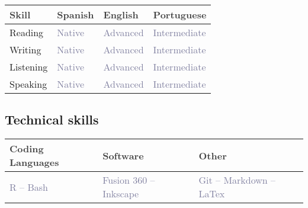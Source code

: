 \documentclass[11pt,a4paper,]{awesome-cv}
\begin{document}
\begin{table}[H]
\centering\begingroup\fontsize{10}{12}\selectfont

\begin{tabular}{>{\centering\arraybackslash}p{4.5cm}>{\centering\arraybackslash}p{4.5cm}>{\centering\arraybackslash}p{4.5cm}>{\centering\arraybackslash}p{4.5cm}}
\toprule
\textcolor[HTML]{414141}{\textbf{Skill}} & \textcolor[HTML]{414141}{\textbf{Spanish}} & \textcolor[HTML]{414141}{\textbf{English}} & \textcolor[HTML]{414141}{\textbf{Portuguese}}\\
\midrule
Reading & \textcolor[HTML]{7f7f9f}{Native} & \textcolor[HTML]{7f7f9f}{Advanced} & \textcolor[HTML]{7f7f9f}{Intermediate}\\
Writing & \textcolor[HTML]{7f7f9f}{Native} & \textcolor[HTML]{7f7f9f}{Advanced} & \textcolor[HTML]{7f7f9f}{Intermediate}\\
Listening & \textcolor[HTML]{7f7f9f}{Native} & \textcolor[HTML]{7f7f9f}{Advanced} & \textcolor[HTML]{7f7f9f}{Intermediate}\\
Speaking & \textcolor[HTML]{7f7f9f}{Native} & \textcolor[HTML]{7f7f9f}{Advanced} & \textcolor[HTML]{7f7f9f}{Intermediate}\\
\bottomrule
\end{tabular}
\endgroup{}
\end{table}

\hypertarget{technical-skills}{%
\subsection{\texorpdfstring{ Technical
skills}{ Technical skills}}\label{technical-skills}}

\begin{table}[H]
\centering\begingroup\fontsize{10}{12}\selectfont

\begin{tabular}{>{\centering\arraybackslash}p{4.75cm}>{\centering\arraybackslash}p{4.75cm}>{\centering\arraybackslash}p{4.75cm}}
\toprule
\textcolor[HTML]{414141}{\textbf{Coding Languages}} & \textcolor[HTML]{414141}{\textbf{Software}} & \textcolor[HTML]{414141}{\textbf{Other}}\\
\midrule
\textcolor[HTML]{7f7f9f}{R -- Bash} & \textcolor[HTML]{7f7f9f}{Fusion 360 -- Inkscape} & \textcolor[HTML]{7f7f9f}{Git -- Markdown -- LaTex}\\
\bottomrule
\end{tabular}
\endgroup{}
\end{table}


\label{LastPage}~
\end{document}
